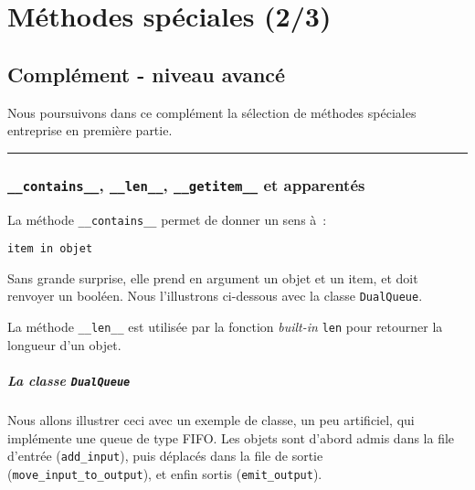     
    
    
    

    

    \hypertarget{muxe9thodes-spuxe9ciales-23}{%
\section{Méthodes spéciales (2/3)}\label{muxe9thodes-spuxe9ciales-23}}

    \hypertarget{compluxe9ment---niveau-avancuxe9}{%
\subsection{Complément - niveau
avancé}\label{compluxe9ment---niveau-avancuxe9}}

    Nous poursuivons dans ce complément la sélection de méthodes spéciales
entreprise en première partie.

    \begin{center}\rule{0.5\linewidth}{\linethickness}\end{center}

    \hypertarget{contains__-__len__-__getitem__-et-apparentuxe9s}{%
\subsubsection{\texorpdfstring{\texttt{\_\_contains\_\_},
\texttt{\_\_len\_\_}, \texttt{\_\_getitem\_\_} et
apparentés}{\_\_contains\_\_, \_\_len\_\_, \_\_getitem\_\_ et apparentés}}\label{contains__-__len__-__getitem__-et-apparentuxe9s}}

    La méthode \texttt{\_\_contains\_\_} permet de donner un sens à~:

\begin{verbatim}
item in objet
\end{verbatim}

Sans grande surprise, elle prend en argument un objet et un item, et
doit renvoyer un booléen. Nous l'illustrons ci-dessous avec la classe
\texttt{DualQueue}.

    La méthode \texttt{\_\_len\_\_} est utilisée par la fonction
\emph{built-in} \texttt{len} pour retourner la longueur d'un objet.

    \hypertarget{la-classe-dualqueue}{%
\subparagraph{\texorpdfstring{La classe
\texttt{DualQueue}}{La classe DualQueue}}\label{la-classe-dualqueue}}

    Nous allons illustrer ceci avec un exemple de classe, un peu artificiel,
qui implémente une queue de type FIFO. Les objets sont d'abord admis
dans la file d'entrée (\texttt{add\_input}), puis déplacés dans la file
de sortie (\texttt{move\_input\_to\_output}), et enfin sortis
(\texttt{emit\_output}).

